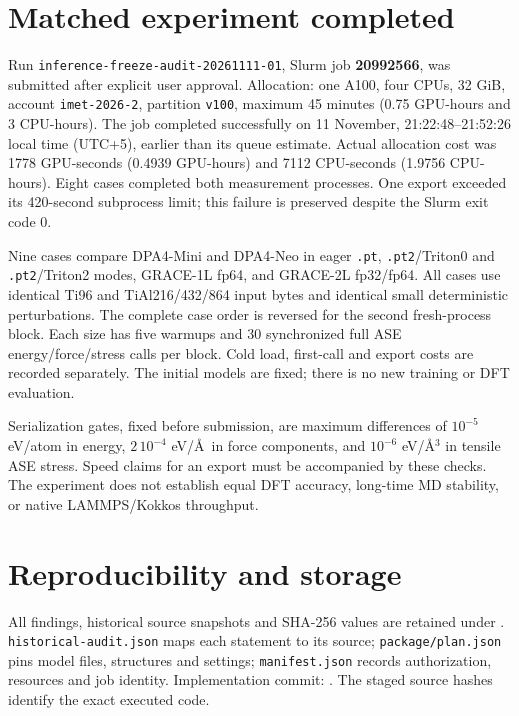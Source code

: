 \documentclass[11pt,a4paper]{article}
\begin{document}
\section*{Matched experiment completed}
Run \texttt{inference-freeze-audit-20261111-01}, Slurm job
\textbf{20992566}, was submitted after explicit user approval.
Allocation: one A100, four CPUs, 32 GiB, account \texttt{imet-2026-2},
partition \texttt{v100}, maximum 45 minutes (0.75 GPU-hours and 3 CPU-hours).
The job completed successfully on 11 November, 21:22:48--21:52:26 local time
(UTC+5), earlier than its queue estimate. Actual allocation cost was 1778
GPU-seconds (0.4939 GPU-hours) and 7112 CPU-seconds (1.9756 CPU-hours).
Eight cases completed both measurement processes. One export exceeded its
420-second subprocess limit; this failure is preserved despite the Slurm exit code 0.

Nine cases compare DPA4-Mini and DPA4-Neo in eager \texttt{.pt},
\texttt{.pt2}/Triton0 and \texttt{.pt2}/Triton2 modes, GRACE-1L fp64,
and GRACE-2L fp32/fp64. All cases use identical Ti96 and TiAl216/432/864
input bytes and identical small deterministic perturbations. The complete
case order is reversed for the second fresh-process block. Each size has
five warmups and 30 synchronized full ASE energy/force/stress calls per block.
Cold load, first-call and export costs are recorded separately.
The initial models are fixed; there is no new training or DFT evaluation.

Serialization gates, fixed before submission, are maximum differences of
$10^{-5}$ eV/atom in energy, $2\,10^{-4}$ eV/\AA\ in force components, and
$10^{-6}$ eV/\AA$^3$ in tensile ASE stress. Speed claims for an export must be
accompanied by these checks. The experiment does not establish equal DFT accuracy,
long-time MD stability, or native LAMMPS/Kokkos throughput.



\section*{Reproducibility and storage}
All findings, historical source snapshots and SHA-256 values are retained under
.
\texttt{historical-audit.json} maps each statement to its source;
\texttt{package/plan.json} pins model files, structures and settings;
\texttt{manifest.json} records authorization, resources and job identity.
Implementation commit:
.
The staged source hashes identify the exact executed code.
\end{document}
